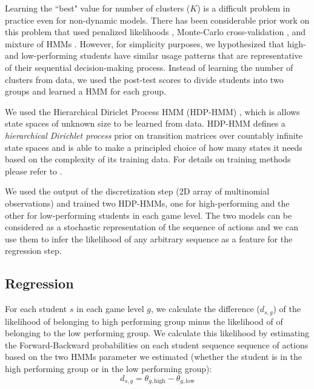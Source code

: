 \documentclass{sigchi}
\begin{document}
Learning the ``best" value for number of clusters ($K$) is a difficult problem in practice even for non-dynamic models. 
There has been considerable prior work on this problem that used penalized likelihoods \cite{rabiner1989hmm}, Monte-Carlo cross-validation \cite{smyth1996clustering}, and mixture of HMMs \cite{smyth1997clustering}. 
However, for simplicity purposes, we hypothesized that high- and low-performing students have similar usage patterns that are representative of their sequential decision-making process. Instead of learning the number of clusters from data, we used the post-test scores to divide students into two groups and learned a HMM for each group.

We used the Hierarchical Diriclet Process HMM (HDP-HMM) \cite{fox2008hdp}, which is allows state spaces of unknown size to be learned from data. 
HDP-HMM defines a \textit{hierarchical Dirichlet process} prior on transition matrices over countably infinite state spaces and is able to make a principled choice of how many states it needs based on the complexity of its training data. 
For details on training methods please refer to \cite{fox2008hdp}.

We used the output of the discretization step (2D array of multinomial observations) and trained two HDP-HMMs, one for high-performing and the other for low-performing students in each game level. The two models can be considered as a stochastic representation of the sequence of actions and we can use them to infer the likelihood of any arbitrary sequence as a feature for the regression step. 

\subsection{Regression}

For each student $s$  in each game level $g$, we calculate the difference ($d_{s,g}$) of the likelihood of belonging to high performing group minus the likelihood of of belonging to the low performing group.
We calculate this likelihood by estimating the Forward-Backward probabilities  on each student sequence sequence of actions  based on the two HMMs parameter we estimated (whether the student is in the high performing group or in the low performing group):
\begin{equation}
d_{s,g} = \theta_{g, \text{high}} - \theta_{g, \text{low}}
\end{equation}
\end{document}
